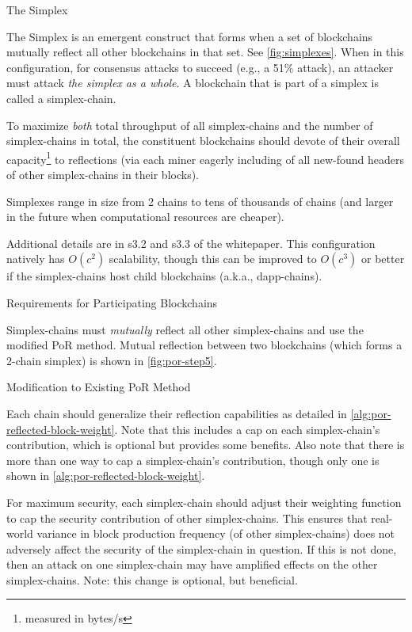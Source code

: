 \begin{section}{The Simplex}

 The Simplex is an emergent construct that forms when a set of blockchains mutually reflect all other blockchains in that set. See \autoref{fig:simplexes}. When in this configuration, for consensus attacks to succeed (e.g., a 51\% attack), an attacker must attack \emph{the simplex as a whole}. A blockchain that is part of a simplex is called a simplex-chain.

 To maximize \emph{both} total throughput of all simplex-chains and the number of simplex-chains in total, the constituent blockchains should devote  of their overall capacity\footnote{measured in bytes/s} to reflections (via each miner eagerly including of all new-found headers of other simplex-chains in their blocks).

 Simplexes range in size from 2 chains to tens of thousands of chains (and larger in the future when computational resources are cheaper).

 Additional details are in s3.2 and s3.3 of the whitepaper. This configuration natively has $O(c^2)$ scalability, though this can be improved to $O(c^3)$ or better if the simplex-chains host child blockchains (a.k.a., dapp-chains).

 \begin{subsection}{Requirements for Participating Blockchains}

     Simplex-chains must \emph{mutually} reflect all other simplex-chains and use the modified PoR method. Mutual reflection between two blockchains (which forms a 2-chain simplex) is shown in \autoref{fig:por-step5}.

 \end{subsection}
 \begin{subsection}{Modification to Existing PoR Method}

     Each chain should generalize their reflection capabilities as detailed in \autoref{alg:por-reflected-block-weight}. Note that this includes a cap on each simplex-chain's contribution, which is optional but provides some benefits. Also note that there is more than one way to cap a simplex-chain's contribution, though only one is shown in \autoref{alg:por-reflected-block-weight}.

     For maximum security, each simplex-chain should adjust their weighting function to cap the security contribution of other simplex-chains.
     This ensures that real-world variance in block production frequency (of other simplex-chains) does not adversely affect the security of the simplex-chain in question.
     If this is not done, then an attack on one simplex-chain may have amplified effects on the other simplex-chains.
     Note: this change is optional, but beneficial.


\end{subsection}
\end{section}
